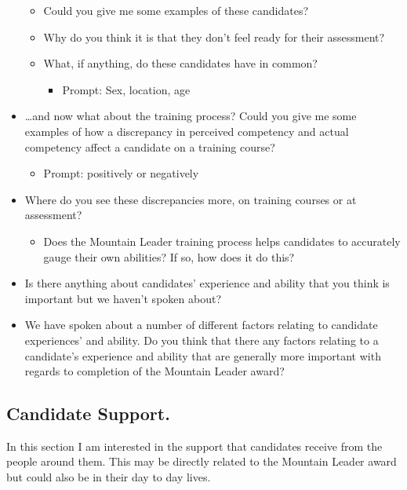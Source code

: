 \documentclass[
  12pt,
  a4paper,
]{book}
\providecommand{\tightlist}{%
  \setlength{\itemsep}{0pt}\setlength{\parskip}{0pt}}
\begin{document}
\begin{itemize}
  \begin{itemize}
  \tightlist
  \item
    Could you give me some examples of these candidates?
  \item
    Why do you think it is that they don't feel ready for their assessment?
  \item
    What, if anything, do these candidates have in common?

    \begin{itemize}
    \tightlist
    \item
      Prompt: Sex, location, age
    \end{itemize}
  \end{itemize}
\item
  \ldots and now what about the training process? Could you give me some examples of how a discrepancy in perceived competency and actual competency affect a candidate on a training course?

  \begin{itemize}
  \tightlist
  \item
    Prompt: positively or negatively
  \end{itemize}
\item
  Where do you see these discrepancies more, on training courses or at assessment?

  \begin{itemize}
  \tightlist
  \item
    Does the Mountain Leader training process helps candidates to accurately gauge their own abilities? If so, how does it do this?
  \end{itemize}
\item
  Is there anything about candidates' experience and ability that you think is important but we haven't spoken about?
\item
  We have spoken about a number of different factors relating to candidate experiences' and ability. Do you think that there any factors relating to a candidate's experience and ability that are generally more important with regards to completion of the Mountain Leader award?
\end{itemize}

\hypertarget{candidate-support.}{%
\subsection{Candidate Support.}\label{candidate-support.}}

In this section I am interested in the support that candidates receive from the people around them. This may be directly related to the Mountain Leader award but could also be in their day to day lives.
\end{document}
